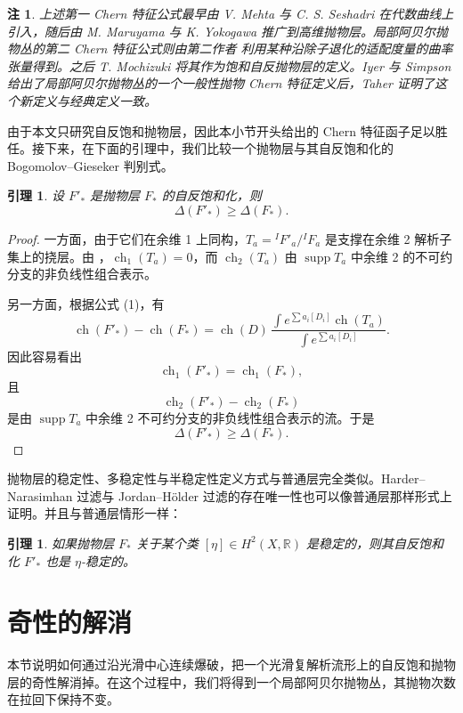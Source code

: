\documentclass[12pt,a4paper]{article}
\newtheorem{lemma}[theorem]{引理}
\newtheorem{remark}[theorem]{注}
\newcommand{\ch}{\operatorname{ch}}
\newcommand{\supp}{\operatorname{supp}}
\begin{document}
\begin{remark}
上述第一 Chern 特征公式最早由 V. Mehta 与 C. S. Seshadri \cite{MehtaSeshadri} 在代数曲线上引入，随后由 M. Maruyama 与 K. Yokogawa \cite{MaruyamaYokogawa} 推广到高维抛物层。局部阿贝尔抛物丛的第二 Chern 特征公式则由第二作者 \cite[Lemma 7.3, 7.4]{Li2000} 利用某种沿除子退化的适配度量的曲率张量得到。之后 T. Mochizuki \cite{MochizukiBook} 将其作为饱和自反抛物层的定义。Iyer 与 Simpson \cite{IyerSimpson} 给出了局部阿贝尔抛物丛的一个一般性抛物 Chern 特征定义后，Taher \cite{Taher} 证明了这个新定义与经典定义一致。
\end{remark}

由于本文只研究自反饱和抛物层，因此本小节开头给出的 Chern 特征函子足以胜任。接下来，在下面的引理中，我们比较一个抛物层与其自反饱和化的 Bogomolov--Gieseker 判别式。

\begin{lemma}
设 \(F'_*\) 是抛物层 \(F_*\) 的自反饱和化，则
\[
\Delta(F'_*)\ge \Delta(F_*).
\]
\end{lemma}

\begin{proof}
一方面，由于它们在余维 1 上同构，\(T_a={}^{I}F'_a/{}^{I}F_a\) 是支撑在余维 2 解析子集上的挠层。由 \cite[Theorem 1.1]{KaufmannLarkangWulcan}，\(\ch_1(T_a)=0\)，而 \(\ch_2(T_a)\) 由 \(\supp T_a\) 中余维 2 的不可约分支的非负线性组合表示。

另一方面，根据公式 (1)，有
\[
\ch(F'_*)-\ch(F_*)
=
\ch(D)\,
\frac{\int e^{\sum a_i[D_i]}\ch(T_a)}
{\int e^{\sum a_i[D_i]}}.
\]
因此容易看出
\[
\ch_1(F'_*)=\ch_1(F_*),
\]
且
\[
\ch_2(F'_*)-\ch_2(F_*)
\]
是由 \(\supp T_a\) 中余维 2 不可约分支的非负线性组合表示的流。于是
\[
\Delta(F'_*)\ge \Delta(F_*).
\]
\end{proof}

抛物层的稳定性、多稳定性与半稳定性定义方式与普通层完全类似。Harder--Narasimhan 过滤与 Jordan--H\"older 过滤的存在唯一性也可以像普通层那样形式上证明。并且与普通层情形一样：

\begin{lemma}
如果抛物层 \(F_*\) 关于某个类 \([\eta]\in H^2(X,\mathbb R)\) 是稳定的，则其自反饱和化 \(F'_*\) 也是 \(\eta\)-稳定的。
\end{lemma}

\section{奇性的解消}

本节说明如何通过沿光滑中心连续爆破，把一个光滑复解析流形上的自反饱和抛物层的奇性解消掉。在这个过程中，我们将得到一个局部阿贝尔抛物丛，其抛物次数在拉回下保持不变。
\end{document}
